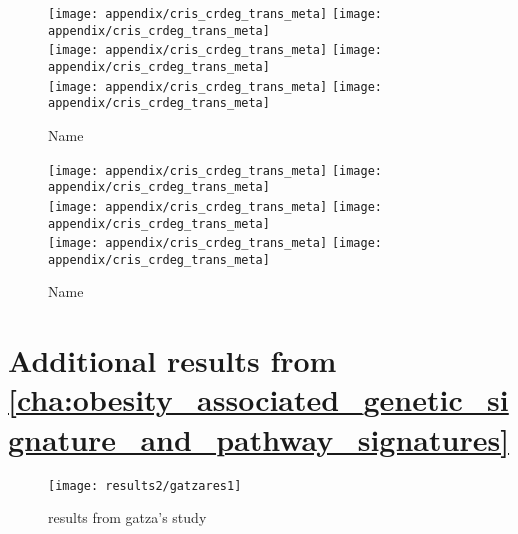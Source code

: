 \begin{appendices}
	\begin{figure}[htpb]
		\ContinuedFloat
		\captionsetup{list=off,format=cont}
		\centering
		\texttt{[image: appendix/cris\_crdeg\_trans\_meta]}
		\hfill
		\texttt{[image: appendix/cris\_crdeg\_trans\_meta]}\\
		\texttt{[image: appendix/cris\_crdeg\_trans\_meta]}
		\hfill
		\texttt{[image: appendix/cris\_crdeg\_trans\_meta]}\\
		\texttt{[image: appendix/cris\_crdeg\_trans\_meta]}
		\hfill
		\texttt{[image: appendix/cris\_crdeg\_trans\_meta]}\\
		\caption{Name}
	\end{figure}

	\begin{figure}[htpb]
		\ContinuedFloat
		\captionsetup{list=off,format=cont}
		\centering
		\texttt{[image: appendix/cris\_crdeg\_trans\_meta]}
		\hfill
		\texttt{[image: appendix/cris\_crdeg\_trans\_meta]}\\
		\texttt{[image: appendix/cris\_crdeg\_trans\_meta]}
		\hfill
		\texttt{[image: appendix/cris\_crdeg\_trans\_meta]}\\
		\texttt{[image: appendix/cris\_crdeg\_trans\_meta]}
		\hfill
		\texttt{[image: appendix/cris\_crdeg\_trans\_meta]}\\
		\caption{Name}
	\end{figure}

	\chapter{Additional results from \cref{cha:obesity_associated_genetic_signature_and_pathway_signatures}}
	\label{app:b}

	\begin{figure}[htpb]
		\centering
		\texttt{[image: results2/gatzares1]}
		\caption{results from gatza's study}
		\label{fig:gatza_paper_res}
	\end{figure}




\end{appendices}

